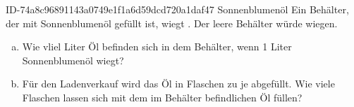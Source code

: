 \begin{exercise}
      {ID-74a8c96891143a0749e1f1a6d59dcd720a1daf47}
      {Sonnenblumenöl}
  \ifproblem\problem
    Ein Behälter, der mit Sonnenblumenöl gefüllt ist, wiegt  .
    Der leere Behälter würde   wiegen.
    \begin{enumerate}[a)]
      \item Wie vliel Liter Öl befinden sich in dem Behälter, wenn 1 Liter
            Sonnenblumenöl  wiegt?
      \item Für den Ladenverkauf wird das Öl in Flaschen zu je 
            abgefüllt. Wie viele Flaschen lassen sich mit dem im Behälter
            befindlichen Öl füllen?
    \end{enumerate}
  \fi
\end{exercise}
